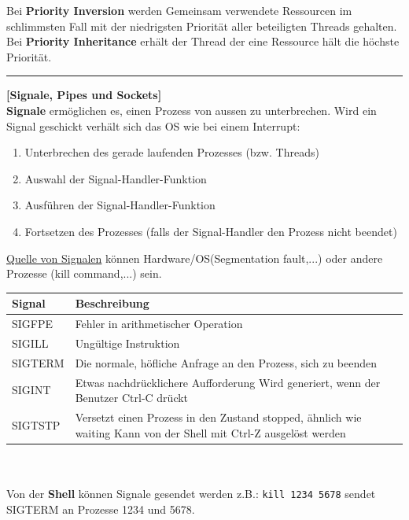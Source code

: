 \documentclass[8pt]{extarticle}
\let\oldtextbf\textbf
\renewcommand{\textbf}{\tiny\oldtextbf}
\begin{document}
\begin{multicols*}{5}
	Bei \textbf{Priority Inversion} werden Gemeinsam verwendete Ressourcen im schlimmsten Fall mit der niedrigsten Priorität aller beteiligten Threads gehalten. Bei \textbf{Priority Inheritance} erhält der Thread der eine Ressource hält die höchste Priorität.\\
	
	\rule{\linewidth}{0.4pt}
	\textbf{[Signale, Pipes und Sockets]}\\
	
	\textbf{Signale} ermöglichen es, einen Prozess von aussen zu unterbrechen. Wird ein Signal geschickt verhält sich das OS wie bei einem Interrupt:
	\begin{enumerate}[noitemsep, topsep=0pt, leftmargin=*]
		\item Unterbrechen des gerade laufenden Prozesses (bzw. Threads)
		\item Auswahl der Signal-Handler-Funktion
		\item Ausführen der Signal-Handler-Funktion
		\item Fortsetzen des Prozesses (falls der Signal-Handler den Prozess nicht beendet)
	\end{enumerate}
	\underline{Quelle von Signalen} können Hardware/OS(Segmentation fault,...) oder andere Prozesse (kill command,...) sein.\\
	\begin{tabular}{|p{1cm}|p{3.5cm}|} %
		\hline
		Signal & Beschreibung\\                                                                                                                                                                                                                                                                                                                                               
		\hline
		SIGFPE & Fehler in arithmetischer Operation\\
		\hline
		SIGILL & Ungültige Instruktion\\
		\hline
		SIGTERM & Die normale, höfliche Anfrage an den Prozess, sich zu beenden\\
		\hline
		SIGINT & Etwas nachdrücklichere Aufforderung Wird generiert, wenn der Benutzer Ctrl-C drückt\\
		\hline
		SIGTSTP & Versetzt einen Prozess in den Zustand stopped, ähnlich wie waiting Kann von der Shell mit Ctrl-Z ausgelöst werden\\
		\hline
	\end{tabular}\\
	\vspace{5pt}\\
	Von der \textbf{Shell} können Signale gesendet werden z.B.: \texttt{kill 1234 5678} sendet SIGTERM an Prozesse 1234 und 5678.\\
	

\end{multicols*}
\end{document}
